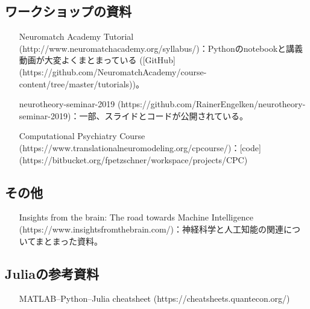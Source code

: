 \subsection{ワークショップの資料
}
\begin{itemize}
\item [Neuromatch Academy Tutorial](http://www.neuromatchacademy.org/syllabus/)：Pythonのnotebookと講義動画が大変よくまとまっている ([GitHub](https://github.com/NeuromatchAcademy/course-content/tree/master/tutorials))。

\item [neurotheory-seminar-2019](https://github.com/RainerEngelken/neurotheory-seminar-2019)：一部、スライドとコードが公開されている。

\item [Computational Psychiatry Course](https://www.translationalneuromodeling.org/cpcourse/)：[code](https://bitbucket.org/fpetzschner/workspace/projects/CPC)

\end{itemize}


\subsection{その他
}
\begin{itemize}
\item [Insights from the brain: The road towards Machine Intelligence](https://www.insightsfromthebrain.com/)：神経科学と人工知能の関連についてまとまった資料。

\end{itemize}


\subsection{Juliaの参考資料
}
\begin{itemize}
\item [MATLAB–Python–Julia cheatsheet](https://cheatsheets.quantecon.org/)

\end{itemize}


